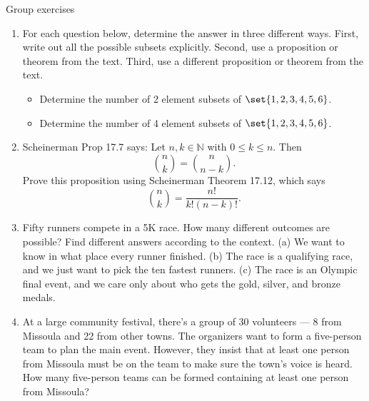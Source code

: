 \documentclass[10pt]{beamer}
\begin{document}
\begin{frame}{Group exercises}
\footnotesize
\begin{enumerate}
	\item For each question below, determine the answer in three different ways.  First, write out all the possible subsets explicitly.  Second, use a proposition or theorem from the text.  Third, use a different proposition or theorem from the text.  

	\begin{itemize} \footnotesize 
	\item[a.] Determine the number of 2 element subsets of $\set{1,2,3,4,5,6}$.
	\item[b.] Determine the number of 4 element subsets of $\set{1,2,3,4,5,6}$.
	\end{itemize}
	\item Scheinerman Prop 17.7 says: Let $n,k \in \mathbb{N}$ with $0 \leq k \leq n$.  Then 
		\[ \binom{n}{k} = \binom{n}{n-k}. \]
	Prove this proposition using Scheinerman  Theorem 17.12, which says
		\[ \binom{n}{k} = \frac{n!}{k!(n-k)!}. \]
	\item Fifty runners compete in a 5K race.  How many different outcomes are possible? Find different answers according to the context. (a) We want to know in what place every runner finished.  (b) The race is a qualifying race, and we just want to pick the ten fastest runners. (c) The race is an Olympic final event, and we care only about who gets the gold, silver, and bronze medals.
	\item   At a large community festival, there’s a group of 30 volunteers — 8 from Missoula and 22 from other towns. The organizers want to form a five-person team to plan the main event. However, they insist that at least one person from Missoula must be on the team to make sure the town’s voice is heard. How many five-person teams can be formed containing at least one person from Missoula?
	\end{enumerate}

\end{frame}
\end{document}
